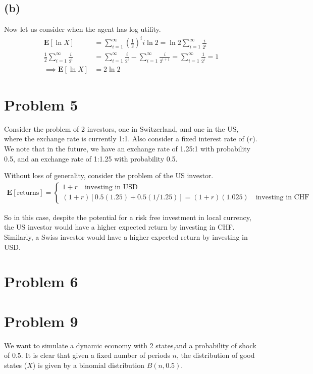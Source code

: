 \documentclass{article}
\begin{document}
	\subsection*{(b)}
	Now let us consider when the agent has log utility.
	\begin{align*}
	\mathbf{E}[\ln X] &= \sum_{i=1}^{\infty}(\frac{1}{2})^i i \ln 2  = \ln 2 \sum_{i=1}^{\infty} \frac{i}{2^i}\\
	\frac{1}{2} \sum_{i=1}^{\infty} \frac{i}{2^i} &= \sum_{i=1}^{\infty} \frac{i}{2^i}  - \sum_{i=1}^{\infty} \frac{i}{2^{i+1}} = \sum_{i=1}^{\infty} \frac{1}{2^i} = 1 \\
	\implies \mathbf{E}[\ln X] &= 2 \ln 2	
	\end{align*}
	
	\section*{Problem 5}
	Consider the problem of 2 investors, one in Switzerland, and one in the US, where the exchange rate is currently 1:1. Also consider a fixed interest rate of ($r$). We note that in the future, we have an exchange rate of 1.25:1 with probability 0.5, and an exchange rate of 1:1.25 with probability 0.5.
	
	Without loss of generality, consider the problem of the US investor.
	\begin{align*}
	\mathbf{E}[\text{returns}] = \begin{cases} 
	1 + r \quad \text{investing in USD}\\
	(1+r)[0.5(1.25) + 0.5(1/1.25)] = (1+r)(1.025) \quad \text{investing in CHF}
	\end{cases}
	\end{align*}
	
	So in this case, despite the potential for a risk free investment in local currency, the US investor would have a higher expected return by investing in CHF. Similarly, a Swiss investor would have a higher expected return by investing in USD.
	
	\section*{Problem 6}
	
	\section*{Problem 9}
	We want to simulate a dynamic economy with 2 states,and a probability of shock of $0.5$. It is clear that given a fixed number of periods $n$, the distribution of good states ($X$) is given by a binomial distribution $B(n,0.5)$.  
	
\end{document}
